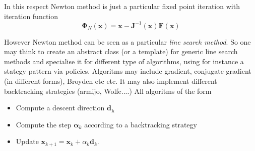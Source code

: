 \documentclass[12pt,twoside]{article}
\begin{document}
In this respect Newton method is just a  particular fixed point iteration with iteration function
\[
\boldsymbol{\Phi}_N(\mathbf{x})=\mathbf{x}-\boldsymbol{J}^{-1}(\mathbf{x})\mathbf{F}(\mathbf{x})
\]

However Newton method can be seen as a particular \emph{line search method}. So one may think to create an abstract class (or a template) for generic line search methods and specialise it for different type of algorithms, using for instance a stategy pattern via policies. Algoritms may include gradient, conjugate gradient (in different forms), Broyden etc etc. It may also implement different backtracking strategies (armijo, Wolfe....) 
All algoritms of the form
\begin{itemize}
\item Compute a descent direction $\mathbf{d_k}$
\item Compute the step $\mathbf{\alpha}_k$ according to a backtracking strategy
\item Update $\mathbf{x}_{k+1}=\mathbf{x}_k+\alpha_k\mathbf{d}_k$.
\end{itemize}
\end{document}
